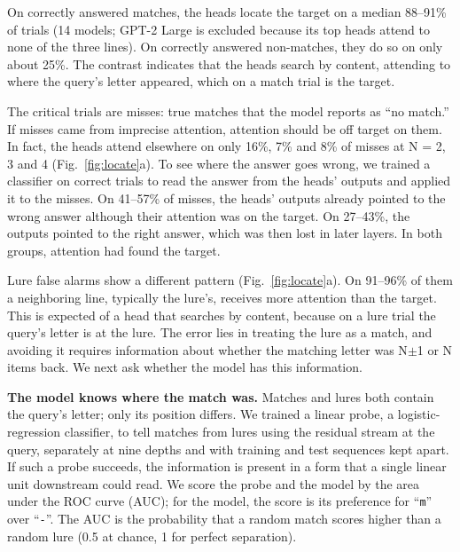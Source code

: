\documentclass{article}
\begin{document}
On correctly answered matches, the heads locate the target on a median 88--91\% of trials (14 models; GPT-2 Large is excluded because its top heads attend to none of the three lines). On correctly answered non-matches, they do so on only about 25\%. The contrast indicates that the heads search by content, attending to where the query's letter appeared, which on a match trial is the target.

The critical trials are misses: true matches that the model reports as ``no match.'' If misses came from imprecise attention, attention should be off target on them. In fact, the heads attend elsewhere on only 16\%, 7\% and 8\% of misses at N = 2, 3 and 4 (Fig.~\ref{fig:locate}a). To see where the answer goes wrong, we trained a classifier on correct trials to read the answer from the heads' outputs and applied it to the misses. On 41--57\% of misses, the heads' outputs already pointed to the wrong answer although their attention was on the target. On 27--43\%, the outputs pointed to the right answer, which was then lost in later layers. In both groups, attention had found the target.

Lure false alarms show a different pattern (Fig.~\ref{fig:locate}a). On 91--96\% of them a neighboring line, typically the lure's, receives more attention than the target. This is expected of a head that searches by content, because on a lure trial the query's letter is at the lure. The error lies in treating the lure as a match, and avoiding it requires information about whether the matching letter was N$\pm$1 or N items back. We next ask whether the model has this information.

\textbf{The model knows where the match was.} Matches and lures both contain the query's letter; only its position differs. We trained a linear probe, a logistic-regression classifier, to tell matches from lures using the residual stream at the query, separately at nine depths and with training and test sequences kept apart. If such a probe succeeds, the information is present in a form that a single linear unit downstream could read. We score the probe and the model by the area under the ROC curve (AUC); for the model, the score is its preference for ``\texttt{m}'' over ``\texttt{-}''. The AUC is the probability that a random match scores higher than a random lure (0.5 at chance, 1 for perfect separation).
\end{document}
